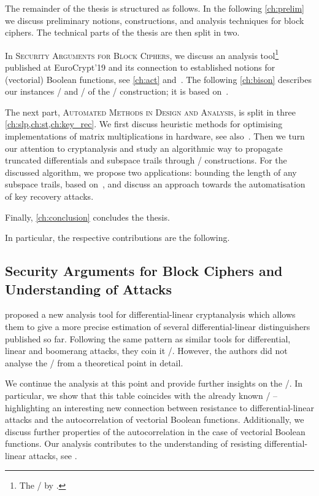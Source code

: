 The remainder of the thesis is structured as follows.
In the following \cref{ch:prelim} we discuss preliminary notions, constructions, and analysis techniques for block ciphers.
The technical parts of the thesis are then split in two.

In \textsc{Security Arguments for Block Ciphers}, we discuss an analysis tool\footnote{%
    The \DLCTl/ by \citeauthor{EC:BDKW19}.
} published at EuroCrypt'19 and its connection to established notions for (vectorial) Boolean functions, see \cref{ch:act} and~\cite{EPRINT:CanKolWie19}.
The following \cref{ch:bison} describes our instances \bison/ and \wisent/ of the \WSNs/ construction; it is based on~\cite{EC:CLLNW19}.

The next part, \textsc{Automated Methods in Design and Analysis}, is split in three \cref{ch:slp,ch:st,ch:key_rec}.
We first discuss heuristic methods for optimising implementations of matrix multiplications in hardware, see also~\cite{ToSC:KLSW17}.
Then we turn our attention to cryptanalysis and study an algorithmic way to propagate truncated differentials and subspace trails through \SPN/ constructions.
For the discussed algorithm, we propose two applications: bounding the length of any subspace trails, based on~\cite{ToSC:LeaTezWie18}, and discuss an approach towards the automatisation of key recovery attacks.

Finally, \cref{ch:conclusion} concludes the thesis.

In particular, the respective contributions are the following.

\subsection{Security Arguments for Block Ciphers and Understanding of Attacks}

\textcite{EC:BDKW19} proposed a new analysis tool for differential-linear cryptanalysis which allows them to give a more precise estimation of several differential-linear distinguishers published so far.
Following the same pattern as similar tools for differential, linear and boomerang attacks, they coin it \DLCT/.
However, the authors did not analyse the \DLCT/ from a theoretical point in detail.

We continue the analysis at this point and provide further insights on the \DLCT/.
In particular, we show that this table coincides with the already known \ACT/ -- highlighting an interesting new connection between resistance to differential-linear attacks and the autocorrelation of vectorial Boolean functions.
Additionally, we discuss further properties of the autocorrelation in the case of vectorial Boolean functions.
Our analysis contributes to the understanding of resisting differential-linear attacks, see .

